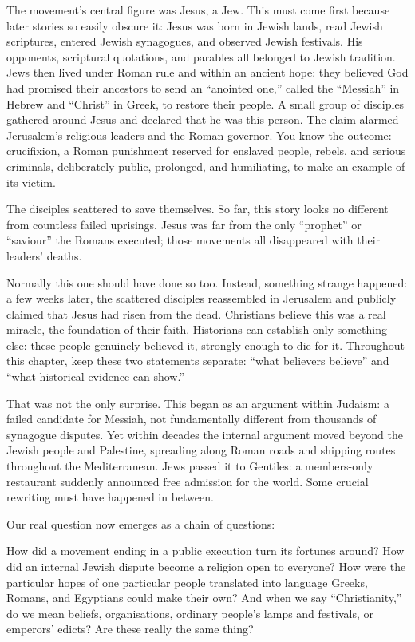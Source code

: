 The movement's central figure was Jesus, a Jew. This must come first because later stories so easily obscure it: Jesus was born in Jewish lands, read Jewish scriptures, entered Jewish synagogues, and observed Jewish festivals. His opponents, scriptural quotations, and parables all belonged to Jewish tradition. Jews then lived under Roman rule and within an ancient hope: they believed God had promised their ancestors to send an ``anointed one,'' called the ``Messiah'' in Hebrew and ``Christ'' in Greek, to restore their people. A small group of disciples gathered around Jesus and declared that he was this person. The claim alarmed Jerusalem's religious leaders and the Roman governor. You know the outcome: crucifixion, a Roman punishment reserved for enslaved people, rebels, and serious criminals, deliberately public, prolonged, and humiliating, to make an example of its victim.

The disciples scattered to save themselves. So far, this story looks no different from countless failed uprisings. Jesus was far from the only ``prophet'' or ``saviour'' the Romans executed; those movements all disappeared with their leaders' deaths.

Normally this one should have done so too. Instead, something strange happened: a few weeks later, the scattered disciples reassembled in Jerusalem and publicly claimed that Jesus had risen from the dead. Christians believe this was a real miracle, the foundation of their faith. Historians can establish only something else: these people genuinely believed it, strongly enough to die for it. Throughout this chapter, keep these two statements separate: ``what believers believe'' and ``what historical evidence can show.''

That was not the only surprise. This began as an argument within Judaism: a failed candidate for Messiah, not fundamentally different from thousands of synagogue disputes. Yet within decades the internal argument moved beyond the Jewish people and Palestine, spreading along Roman roads and shipping routes throughout the Mediterranean. Jews passed it to Gentiles: a members-only restaurant suddenly announced free admission for the world. Some crucial rewriting must have happened in between.

Our real question now emerges as a chain of questions:

How did a movement ending in a public execution turn its fortunes around? How did an internal Jewish dispute become a religion open to everyone? How were the particular hopes of one particular people translated into language Greeks, Romans, and Egyptians could make their own? And when we say ``Christianity,'' do we mean beliefs, organisations, ordinary people's lamps and festivals, or emperors' edicts? Are these really the same thing?

